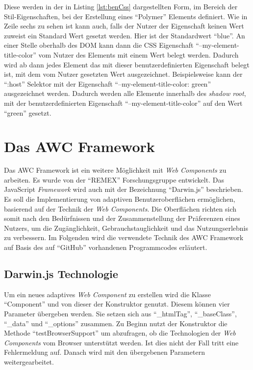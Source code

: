 \documentclass[12pt, paper=a4, bibtotoc, toc=listof, headsepline=true, numbers=endperiod]{scrreprt}
\begin{document}
Diese werden in der in Listing \ref{lst:benCss} dargestellten Form, im Bereich der Stil-Eigenschaften, bei der Erstellung eines \enquote{Polymer} Elements definiert. Wie in Zeile sechs zu sehen ist kann auch, falls der Nutzer der Eigenschaft keinen Wert zuweist ein Standard Wert gesetzt werden. Hier ist der Standardwert \enquote{blue}. An einer Stelle oberhalb des \ac{DOM} kann dann die \ac{CSS} Eigenschaft \enquote{--my-element-title-color} vom Nutzer des Elements mit einem Wert belegt werden. Dadurch wird ab dann jedes Element das mit dieser benutzerdefinierten Eigenschaft belegt ist, mit dem vom Nutzer gesetzten Wert ausgezeichnet. Beispielsweise kann der \enquote{:host} Selektor mit der Eigenschaft \enquote{--my-element-title-color: green} ausgezeichnet werden. Dadurch werden alle Elemente innerhalb des \emph{shadow root}, mit der benutzerdefinierten Eigenschaft \enquote{--my-element-title-color} auf den Wert \enquote{green} gesetzt.
\chapter{Das AWC Framework}	
Das \ac{AWC Framework} ist ein weitere Möglichkeit mit \emph{Web Components} zu arbeiten. Es wurde von der \enquote{REMEX} Forschungsgruppe entwickelt. Das JavaScript \emph{Framework} wird auch mit der Bezeichnung \enquote{Darwin.js} beschrieben. Es soll die Implementierung von adaptiven Benutzeroberflächen ermöglichen, basierend auf der Technik der \emph{Web Components}. Die Oberflächen richten sich somit nach den Bedürfnissen und der Zusammenstellung der Präferenzen eines Nutzers, um die Zugänglichkeit, Gebrauchstauglichkeit und das Nutzungserlebnis zu verbessern\cite{darwin}. Im Folgenden wird die verwendete Technik des \ac{AWC Framework} auf Basis des auf \enquote{GitHub} vorhandenen Programmcodes erläutert\cite{gitHubAwc}. 
\section{Darwin.js Technologie}
Um ein neues adaptives \emph{Web Component} zu erstellen wird die Klasse \enquote{Component} und von dieser der Konstruktor genutzt. Diesem können vier Parameter übergeben werden. Sie setzen sich aus \enquote{\_htmlTag}, \enquote{\_baseClass}, \enquote{\_data} und \enquote{\_options} zusammen. Zu Beginn nutzt der Konstruktor die Methode \enquote{testBrowserSupport} um abzufragen, ob die Technologien der \emph{Web Components} vom Browser unterstützt werden. Ist dies nicht der Fall tritt eine Fehlermeldung auf. Danach wird mit den übergebenen Parametern weitergearbeitet.
\end{document}
